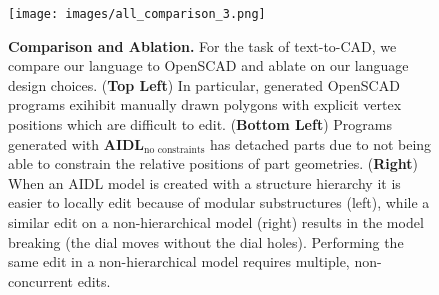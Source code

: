 




\begin{figure}[htbp!]
  \centering
  \texttt{[image: images/all\_comparison\_3.png]}
  \caption{\textbf{Comparison and Ablation.} For the task of text-to-CAD, we compare our language to OpenSCAD and ablate on our language design choices. (\textbf{Top Left}) In particular, generated OpenSCAD programs exihibit manually drawn polygons with explicit vertex positions which are difficult to edit. (\textbf{Bottom Left}) Programs generated with $\textbf{AIDL}_{\text{no constraints}}$ has detached parts due to not being able to constrain the relative positions of part geometries. (\textbf{Right}) When an AIDL model is created with a structure hierarchy it is easier to locally edit because of modular substructures (left), while a similar edit on a non-hierarchical model (right) results in the model breaking (the dial moves without the dial holes). Performing the same edit in a non-hierarchical model requires multiple, non-concurrent edits.}
  \label{fig:Comparison}
\end{figure}

